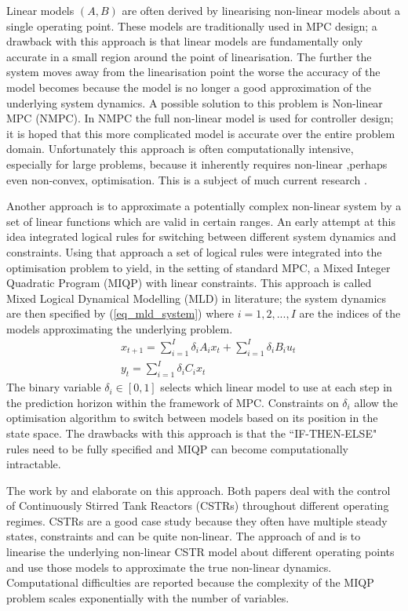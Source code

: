 Linear models $(A, B)$ are often derived by linearising non-linear models about a single operating point. These models are traditionally used in MPC design; a drawback with this approach is that linear models are fundamentally only accurate in a small region around the point of linearisation. The further the system moves away from the linearisation point the worse the accuracy of the model becomes because the model is no longer a good approximation of the underlying system dynamics. A possible solution to this problem is Non-linear MPC (NMPC). In NMPC the full non-linear model is used for controller design; it is hoped that this more complicated model is accurate over the entire problem domain. Unfortunately this approach is often computationally intensive, especially for large problems, because it inherently requires non-linear ,perhaps even non-convex, optimisation. This is a subject of much current research \cite{diehl}. 

Another approach is to approximate a potentially complex non-linear system by a set of linear functions which are valid in certain ranges. An early attempt at this idea \cite{bemporad} integrated logical rules for switching between different system dynamics and constraints. Using that approach a set of logical rules were integrated into the optimisation problem to yield, in the setting of standard MPC, a Mixed Integer Quadratic Program (MIQP) with linear constraints. This approach is called Mixed Logical Dynamical Modelling (MLD) in literature; the system dynamics are then specified by (\ref{eq_mld_system}) where $i=1,2,..., I$ are the indices of the models approximating the underlying problem.
\begin{equation}
\begin{aligned}
&x_{t+1} = \sum_{i=1}^I \delta_i A_i x_t + \sum_{i=1}^I \delta_i B_i u_t \\
&y_t = \sum_{i=1}^I \delta_i C_i x_t 
\end{aligned}
\label{eq_mld_system}
\end{equation}
The binary variable $\delta_i \in [0, 1]$ selects which linear model to use at each step in the prediction horizon within the framework of MPC. Constraints on $\delta_i$ allow the optimisation algorithm to switch between models based on its position in the state space.  The drawbacks with this approach is that the ``IF-THEN-ELSE" rules need to be fully specified and MIQP can become computationally intractable. 

The work by \cite{du} and \cite{sakakura} elaborate on this approach. Both papers deal with the control of Continuously Stirred Tank Reactors (CSTRs) throughout different operating regimes. CSTRs are a good case study because they often have multiple steady states, constraints and can be quite non-linear. The approach of \cite{du} and \cite{sakakura} is to linearise the underlying non-linear CSTR model about different operating points and use those models to approximate the true non-linear dynamics. Computational difficulties are reported because the complexity of the MIQP problem scales exponentially with the number of variables.

